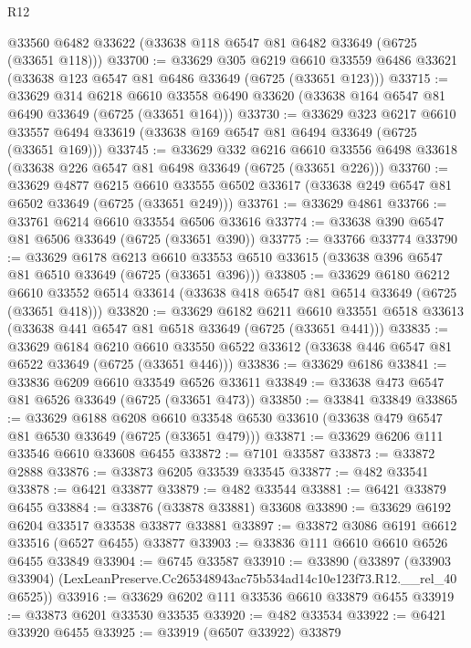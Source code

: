 \begin{lexlean}{R12}
\begin{coremodule}
    @33560
    @6482
    @33622
    (@33638 @118 @6547 @81 @6482 @33649 (@6725 (@33651 @118)))
@33700 := @33629
    @305
    @6219
    @6610
    @33559
    @6486
    @33621
    (@33638 @123 @6547 @81 @6486 @33649 (@6725 (@33651 @123)))
@33715 := @33629
    @314
    @6218
    @6610
    @33558
    @6490
    @33620
    (@33638 @164 @6547 @81 @6490 @33649 (@6725 (@33651 @164)))
@33730 := @33629
    @323
    @6217
    @6610
    @33557
    @6494
    @33619
    (@33638 @169 @6547 @81 @6494 @33649 (@6725 (@33651 @169)))
@33745 := @33629
    @332
    @6216
    @6610
    @33556
    @6498
    @33618
    (@33638 @226 @6547 @81 @6498 @33649 (@6725 (@33651 @226)))
@33760 := @33629
    @4877
    @6215
    @6610
    @33555
    @6502
    @33617
    (@33638 @249 @6547 @81 @6502 @33649 (@6725 (@33651 @249)))
@33761 := @33629 @4861
@33766 := @33761 @6214 @6610 @33554 @6506 @33616
@33774 := @33638 @390 @6547 @81 @6506 @33649 (@6725 (@33651 @390))
@33775 := @33766 @33774
@33790 := @33629
    @6178
    @6213
    @6610
    @33553
    @6510
    @33615
    (@33638 @396 @6547 @81 @6510 @33649 (@6725 (@33651 @396)))
@33805 := @33629
    @6180
    @6212
    @6610
    @33552
    @6514
    @33614
    (@33638 @418 @6547 @81 @6514 @33649 (@6725 (@33651 @418)))
@33820 := @33629
    @6182
    @6211
    @6610
    @33551
    @6518
    @33613
    (@33638 @441 @6547 @81 @6518 @33649 (@6725 (@33651 @441)))
@33835 := @33629
    @6184
    @6210
    @6610
    @33550
    @6522
    @33612
    (@33638 @446 @6547 @81 @6522 @33649 (@6725 (@33651 @446)))
@33836 := @33629 @6186
@33841 := @33836 @6209 @6610 @33549 @6526 @33611
@33849 := @33638 @473 @6547 @81 @6526 @33649 (@6725 (@33651 @473))
@33850 := @33841 @33849
@33865 := @33629
    @6188
    @6208
    @6610
    @33548
    @6530
    @33610
    (@33638 @479 @6547 @81 @6530 @33649 (@6725 (@33651 @479)))
@33871 := @33629 @6206 @111 @33546 @6610 @33608 @6455
@33872 := @7101 @33587
@33873 := @33872 @2888
@33876 := @33873 @6205 @33539 @33545
@33877 := @482 @33541
@33878 := @6421 @33877
@33879 := @482 @33544
@33881 := @6421 @33879 @6455
@33884 := @33876 (@33878 @33881) @33608
@33890 := @33629 @6192 @6204 @33517 @33538 @33877 @33881
@33897 := @33872 @3086 @6191 @6612 @33516 (@6527 @6455) @33877
@33903 := @33836 @111 @6610 @6610 @6526 @6455 @33849
@33904 := @6745 @33587
@33910 := @33890
    (@33897 (@33903 @33904) (LexLeanPreserve.Cc265348943ac75b534ad14c10e123f73.R12.__rel_40 @6525))
@33916 := @33629 @6202 @111 @33536 @6610 @33879 @6455
@33919 := @33873 @6201 @33530 @33535
@33920 := @482 @33534
@33922 := @6421 @33920 @6455
@33925 := @33919 (@6507 @33922) @33879

\end{coremodule}
\end{lexlean}
